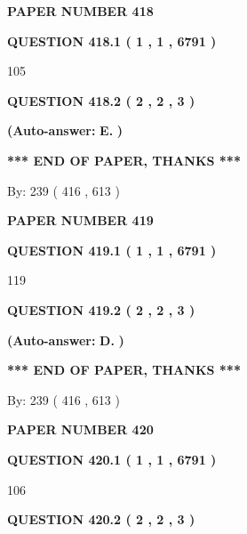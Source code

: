 \documentclass[12pt]{article}
\begin{document}
   
\newpage 
\setcounter{page}{ 
   418001 } 
   
   
 {\textbf{ \Large{ PAPER NUMBER  418  }}}
   
   
   
   
  
  
{\textbf{\large{QUESTION
418.1 
 ( 1 , 1 , 6791 )
}}}

105
  
  
{\textbf{\large{QUESTION
418.2 
 ( 2 , 2 , 3 )
}}}
 
 
{\textbf{(Auto-answer:}}
{\textbf{\large{
E.}}}
{\textbf{)}}
 
 
   
   
   
   
\vspace{1.0in} 
{\textbf{\large{ *** END OF PAPER, THANKS *** }}} 
   
   
\hspace{1.0in} By: 
 239 ( 416 ,  613 )
   
   
   
   
\newpage 
\setcounter{page}{ 
   419001 } 
   
   
 {\textbf{ \Large{ PAPER NUMBER  419  }}}
   
   
   
   
  
  
{\textbf{\large{QUESTION
419.1 
 ( 1 , 1 , 6791 )
}}}

119
  
  
{\textbf{\large{QUESTION
419.2 
 ( 2 , 2 , 3 )
}}}
 
 
{\textbf{(Auto-answer:}}
{\textbf{\large{
D.}}}
{\textbf{)}}
 
 
   
   
   
   
\vspace{1.0in} 
{\textbf{\large{ *** END OF PAPER, THANKS *** }}} 
   
   
\hspace{1.0in} By: 
 239 ( 416 ,  613 )
   
   
   
   
\newpage 
\setcounter{page}{ 
   420001 } 
   
   
 {\textbf{ \Large{ PAPER NUMBER  420  }}}
   
   
   
   
  
  
{\textbf{\large{QUESTION
420.1 
 ( 1 , 1 , 6791 )
}}}

106
  
  
{\textbf{\large{QUESTION
420.2 
 ( 2 , 2 , 3 )
}}}
 
\end{document}

